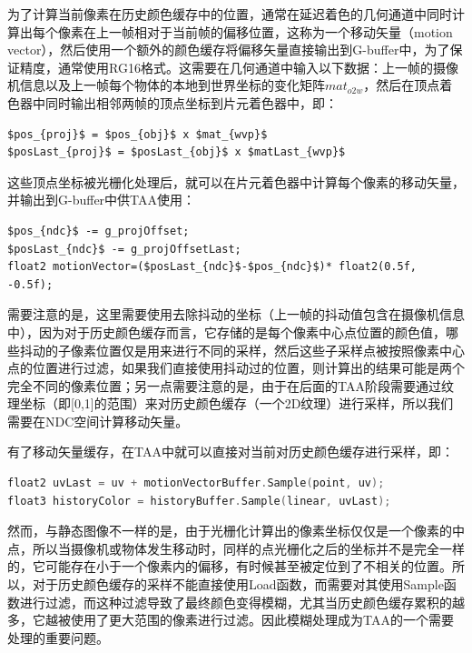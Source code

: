 为了计算当前像素在历史颜色缓存中的位置，通常在延迟着色的几何通道中同时计算出每个像素在上一帧相对于当前帧的偏移位置，这称为一个移动矢量（motion vector），然后使用一个额外的颜色缓存将偏移矢量直接输出到G-buffer中，为了保证精度，通常使用RG16格式。这需要在几何通道中输入以下数据：上一帧的摄像机信息以及上一帧每个物体的本地到世界坐标的变化矩阵$mat_{o2w}$，然后在顶点着色器中同时输出相邻两帧的顶点坐标到片元着色器中，即：

\begin{lstlisting}[mathescape=true]
$pos_{proj}$ = $pos_{obj}$ x $mat_{wvp}$
$posLast_{proj}$ = $posLast_{obj}$ x $matLast_{wvp}$
\end{lstlisting}

这些顶点坐标被光栅化处理后，就可以在片元着色器中计算每个像素的移动矢量，并输出到G-buffer中供TAA使用：

\begin{lstlisting}[mathescape=true]
$pos_{ndc}$ -= g_projOffset;
$posLast_{ndc}$ -= g_projOffsetLast;
float2 motionVector=($posLast_{ndc}$-$pos_{ndc}$)* float2(0.5f, -0.5f);
\end{lstlisting}

需要注意的是，这里需要使用去除抖动的坐标（上一帧的抖动值包含在摄像机信息中），因为对于历史颜色缓存而言，它存储的是每个像素中心点位置的颜色值，哪些抖动的子像素位置仅是用来进行不同的采样，然后这些子采样点被按照像素中心点的位置进行过滤，如果我们直接使用抖动过的位置，则计算出的结果可能是两个完全不同的像素位置；另一点需要注意的是，由于在后面的TAA阶段需要通过纹理坐标（即[0,1]的范围）来对历史颜色缓存（一个2D纹理）进行采样，所以我们需要在NDC空间计算移动矢量。

有了移动矢量缓存，在TAA中就可以直接对当前对历史颜色缓存进行采样，即：

\begin{lstlisting}[language=C++]
float2 uvLast = uv + motionVectorBuffer.Sample(point, uv);
float3 historyColor = historyBuffer.Sample(linear, uvLast);
\end{lstlisting}

然而，与静态图像不一样的是，由于光栅化计算出的像素坐标仅仅是一个像素的中点，所以当摄像机或物体发生移动时，同样的点光栅化之后的坐标并不是完全一样的，它可能存在小于一个像素内的偏移，有时候甚至被定位到了不相关的位置\cite{a:TemporalAntialiasingInUncharted4}。所以，对于历史颜色缓存的采样不能直接使用Load函数，而需要对其使用Sample函数进行过滤，而这种过滤导致了最终颜色变得模糊，尤其当历史颜色缓存累积的越多，它越被使用了更大范围的像素进行过滤。因此模糊处理成为TAA的一个需要处理的重要问题。







